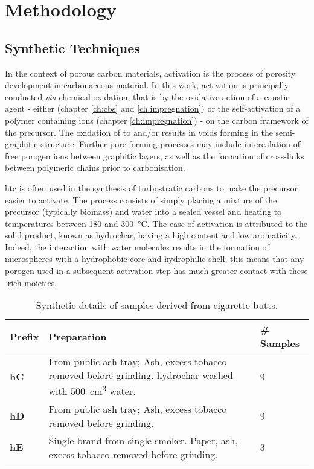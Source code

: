 \chapter{Methodology}
\label{ch:methodology}

\newpage
\section{Synthetic Techniques}

In the context of porous carbon materials, activation is the process of porosity development in carbonaceous material.\citep{Sevilla2014Energy} In this work, activation is principally conducted \textit{via} chemical oxidation,\citep{Sevilla2014Energy} that is by the oxidative action of a caustic agent - either  (chapter \ref{ch:cbs} and \ref{ch:impregnation}) or the self-activation of a polymer containing  ions (chapter \ref{ch:impregnation}) - on the carbon framework of the precursor. The oxidation of  to  and/or  results in voids forming in the semi-graphitic structure.\citep{Wang2009High, Wang2012, Otowa1993Production} Further pore-forming processes may include intercalation of free \gls{porogen} ions between graphitic layers,\citep{LozanoCastello2007Carbon} as well as the formation of cross-links between polymeric chains prior to carbonisation.\citep{lin2015preparation, yu2017koh, yu2017one}

\Gls{htc} is often used in the synthesis of \glspl{turbostratic carbon} to make the precursor easier to activate. The process consists of simply placing a mixture of the precursor (typically biomass) and water into a sealed vessel and heating to temperatures between 180 and \qty{300}{\degreeCelsius}. The ease of activation is attributed to the solid product, known as \gls{hydrochar}, having a high  content and low aromaticity.\citep{Sevilla2011Hydrothermal, Sevilla2009Chemical, Sevilla2009a} Indeed, the interaction with water molecules results in the formation of microspheres with a hydrophobic core and hydrophilic shell; this means that any \gls{porogen} used in a subsequent activation step has much greater contact with these -rich moieties.

\begin{table}[hb!]
    \caption{Synthetic details of samples derived from cigarette butts.}
    \label{tb:cb_synthesis}
    \begin{tabularx}{\textwidth}{lXl}
        \toprule
            \textbf{Prefix} & \textbf{Preparation}  & \textbf{\# Samples} \\ 
        \midrule
            \textbf{hC}     & From public ash tray; Ash, excess tobacco removed before grinding. \Gls{hydrochar} washed with \qty{500}{\cm\cubed} water.  & 9              \\
            \textbf{hD}     &  From public ash tray; Ash, excess tobacco removed before grinding. & 9             \\
            \textbf{hE}     & Single brand from single smoker. Paper, ash, excess tobacco removed before grinding.  & 3              \\
        \bottomrule
    \end{tabularx}%
\end{table}

